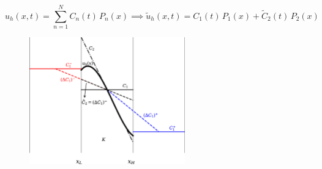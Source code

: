 \documentclass{beamer}
\begin{document}
\begin{frame}

  \Fontvi
  \begin{equation*}
  u_{h}\left(x,t\right)
  =\sum\limits_{n=1}^{N}
  C_{n}\left(t\right)\,P_{n}\left(x\right)\implies
  \tilde{u}_{h}\left(x,t\right)
  =C_{1}\left(t\right)\,P_{1}\left(x\right)
  +\tilde{C}_{2}\left(t\right)\,P_{2}\left(x\right)
  \end{equation*}

  \begin{figure}[htb!]
    \centering
    \includegraphics[width=0.6\textwidth]{fig.MinMod.jpeg}
  \end{figure}

\end{frame}
\end{document}
